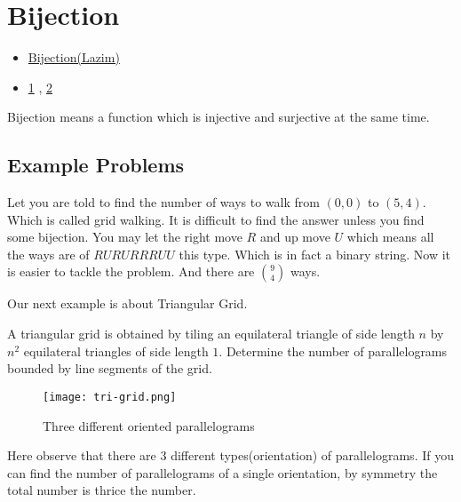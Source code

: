 \chapter{Bijection}%

\begin{linkb}
   \begin{itemize}
        \item \href{https://www.youtube.com/watch?v=Pw0VeDSC_go}{Bijection(Lazim)} 
        \item \href{https://drive.google.com/file/d/1y4aWf4oQsDQvFtwnSwT4JiFHZ_diWT1x/view}{1} , \href{https://drive.google.com/file/d/1zFTQOX1HOWcN1KMPvYR5K2okdZTXP1n1/view}{2}
   \end{itemize}
\end{linkb}



Bijection means a function which is injective  and surjective at the same time. 


\section{Example Problems}
Let you are told to find the number of ways to walk from $(0,0)$ to $(5,4)$. Which is 
called grid walking. It is difficult to find 
the answer unless you find some bijection. 
You may let the right  move $R$ and up move $
U$ which means all the ways are of $RURURRRUU$
 this type. Which is in fact a binary 
 string.  Now it is easier to tackle the  
 problem. And there are $\binom{9}{4}$ ways.


Our next example is about Triangular Grid. 

\begin{example}
A triangular grid is obtained by tiling an equilateral triangle of side length
$n$ by $n^2$ equilateral triangles of side length $1$. Determine the number of parallelograms
bounded by line segments of the grid.
\end{example}
\begin{figure}[ht]
\centering
	\texttt{[image: tri-grid.png]}
	\caption{Three different oriented parallelograms}
\end{figure}
Here observe that there are 3 different types(orientation) of parallelograms.
If you can find the number of parallelograms of a single orientation, by symmetry the total number is thrice the number.

